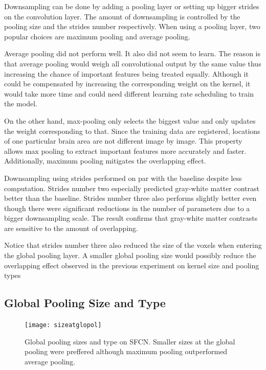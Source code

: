 \documentclass{article}
\begin{document}
    Downsampling can be done by adding a pooling layer or setting up bigger strides on the convolution layer. 
    The amount of downsampling is controlled by the pooling size and the strides number respectively. 
    When using a pooling layer, two popular choices are maximum pooling and average pooling.  

    Average pooling did not perform well. 
    It also did not seem to learn. 
    The reason is that average pooling would weigh all convolutional output by the same value thus increasing the chance of important features being treated equally. 
    Although it could be compensated by increasing the corresponding weight on the kernel, it would take more time and could need different learning rate scheduling to train the model.

    On the other hand, max-pooling only selects the biggest value and only updates the weight corresponding to that. 
    Since the training data are registered, locations of one particular brain area are not different image by image. 
    This property allows max pooling to extract important features more accurately and faster. 
    Additionally, maximum pooling mitigates the overlapping effect.

    Downsampling using strides performed on par with the baseline despite less computation. 
    Strides number two especially predicted gray-white matter contrast better than the baseline. 
    Strides number three also performs slightly better even though there were significant reductions in the number of parameters due to a bigger downsampling scale. 
    The result confirms that gray-white matter contrasts are sensitive to the amount of overlapping.

    Notice that strides number three also reduced the size of the voxels when entering the global pooling layer. 
    A smaller global pooling size would possibly reduce the overlapping effect observed in the previous experiment on kernel size and pooling types

    \subsection*{Global Pooling Size and Type}
    
    \begin{figure}[h]
        \centering
        \texttt{[image: sizeatglopol]}
        \centering
        \caption{
            Global pooling sizes and type on SFCN. 
            Smaller sizes at the global pooling were preffered although maximum pooling outperformed average pooling.}
        \label{fig:glopolsizetype}
    \end{figure}
    
\end{document}
